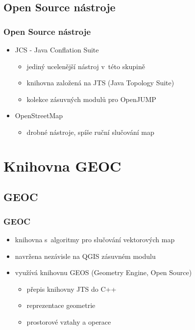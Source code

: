 \documentclass[unicode,bookmarksnumbered]{beamer}
\begin{document}
  \subsection{Open Source nástroje}
  \begin{frame}
    \frametitle{Open Source nástroje}
	\begin{itemize}
	  \item JCS - Java Conflation Suite
	      \begin{itemize}
		\item jediný ucelenější nástroj v~této skupině
		\item knihovna založená na JTS (Java Topology Suite)
		\item kolekce zásuvných modulů pro OpenJUMP %
	      \end{itemize}
	  \item OpenStreetMap %
	      \begin{itemize}
		\item drobné nástroje, spíše ruční slučování map
	      \end{itemize}
	\end{itemize} 
  \end{frame}


\section{Knihovna GEOC}   %

  \subsection{GEOC}
  \begin{frame}
  \frametitle{GEOC}
     \begin{itemize}
      \item knihovna s~algoritmy pro slučování vektorových map
      \item navržena nezávisle na QGIS zásuvném modulu 
      \item využívá knihovnu GEOS (Geometry Engine, Open Source)
      \begin{itemize}
       \item přepis knihovny JTS do C++
       \item reprezentace geometrie
       \item prostorové vztahy a operace
      \end{itemize}

     \end{itemize}
  \end{frame}
\end{document}
